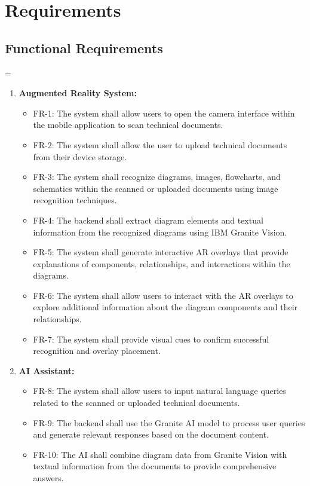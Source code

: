 \documentclass[10pt]{article}
\begin{document}
\newpage

\section{Requirements}
    \subsection{Functional Requirements}
=
    \begin{enumerate}
        \item \textbf{Augmented Reality System:}
            \begin{itemize}
                \item FR-1: The system shall allow users to open the camera interface within the mobile application to scan technical documents.
                \item FR-2: The system shall allow the user to upload technical documents from their device storage.
                \item FR-3: The system shall recognize diagrams, images, flowcharts, and schematics within the scanned or uploaded documents using image recognition techniques.    
                \item FR-4: The backend shall extract diagram elements and textual information from the recognized diagrams using IBM Granite Vision.
                \item FR-5: The system shall generate interactive AR overlays that provide explanations of components, relationships, and interactions within the diagrams.
                \item FR-6: The system shall allow users to interact with the AR overlays to explore additional information about the diagram components and their relationships.
                \item FR-7: The system shall provide visual cues to confirm successful recognition and overlay placement.
            \end{itemize}
        \item \textbf{AI Assistant:}
            \begin{itemize}
                \item FR-8: The system shall allow users to input natural language queries related to the scanned or uploaded technical documents.
                \item FR-9: The backend shall use the Granite AI model to process user queries and generate relevant responses based on the document content.
                \item FR-10: The AI shall combine diagram data from Granite Vision with textual information from the documents to provide comprehensive answers.

\end{itemize}
\end{enumerate}
\end{document}

